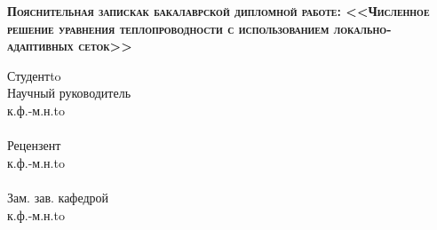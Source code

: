 \begin{titlepage}
    \newpage
    
    \vspace{3em} %
    
   
    \begin{center}
        \textsc{ \textbf{Пояснительная записка\linebreak к бакалаврской дипломной работе: \linebreak  \Large <<Численное решение уравнения теплопроводности с использованием локально-адаптивных сеток>>}}
    \end{center} 

    
    \vspace{5em}
    
   
    \newbox{\lbox}
    
    \setlength{\maxl}{\wd\lbox}
    \hfill\parbox{12cm}{
    \hspace*{1cm}\hspace*{-1cm}Студент\hfill\hbox to\\
    
    \hspace*{1cm}\hspace*{-1cm}Научный руководитель\hfill\\
    \hspace*{1cm}\hspace*{-1cm}к.ф.-м.н.\hfill\hbox to\\ \\
    \hspace*{1cm}\hspace*{-1cm}Рецензент\hfill\\
    \hspace*{1cm}\hspace*{-1cm}к.ф.-м.н.\hfill\hbox to\\ \\ 
    \hspace*{1cm}\hspace*{-1cm}Зам. зав. кафедрой \hfill\\
    \hspace*{1cm}\hspace*{-1cm}к.ф.-м.н.\hfill\hbox to\\ \\ 
    
    }
    
   
    
    


\end{titlepage}
